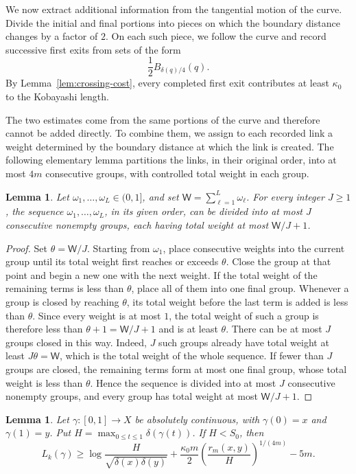 \documentclass[11pt]{article}
\newtheorem{lemma}[theorem]{Lemma}
\theoremstyle{definition}
\begin{document}
We now extract additional information from the tangential motion of the
curve.  Divide the initial and final portions into pieces on which the
boundary distance changes by a factor of \(2\).  On each such piece, we
follow the curve and record successive first exits from sets of the form
\[
\frac12 B_{\delta(q)/4}(q).
\]
By Lemma~\ref{lem:crossing-cost}, every completed first exit contributes
at least \(\kappa_0\) to the Kobayashi length.

The two estimates come from the same portions of the curve and therefore
cannot be added directly.  To combine them, we assign to each recorded
link a weight determined by the boundary distance at which the link is
created.  The following elementary lemma partitions the links, in their
original order, into at most \(4m\) consecutive groups, with controlled
total weight in each group.

\begin{lemma}\label{lem:weight-grouping}
	Let \(\omega_1,\ldots,\omega_L\in(0,1]\), and set
	\(\mathsf W=\sum_{\ell=1}^L\omega_\ell\).
	For every integer \(J\ge1\), the sequence
	\(\omega_1,\ldots,\omega_L\), in its given order, can be divided into
	at most \(J\) consecutive nonempty groups, each having total weight at
	most \(\mathsf W/J+1\).
\end{lemma}

\begin{proof}
	Set \(\theta=\mathsf W/J\).
	Starting from \(\omega_1\), place consecutive weights into the current
	group until its total weight first reaches or exceeds \(\theta\).  Close
	the group at that point and begin a new one with the next weight.  If
	the total weight of the remaining terms is less than \(\theta\), place
	all of them into one final group.
	Whenever a group is closed by reaching \(\theta\), its total weight
	before the last term is added is less than \(\theta\).  Since every
	weight is at most \(1\), the total weight of such a group is therefore
	less than \(\theta+1=\mathsf W/J+1\) and is at least \(\theta\).
	There can be at most \(J\) groups closed in this way.  Indeed, \(J\)
	such groups already have total weight at least
	\(J\theta=\mathsf W\),
	which is the total weight of the whole sequence.  If fewer than \(J\)
	groups are closed, the remaining terms form at most one final group,
	whose total weight is less than \(\theta\).  Hence the sequence is
	divided into at most \(J\) consecutive nonempty groups, and every group
	has total weight at most \(\mathsf W/J+1\).
\end{proof}
\begin{lemma}\label{lem:weighted-exits}
	Let \(\gamma:[0,1]\to X\) be absolutely continuous, with
	\(\gamma(0)=x\) and \(\gamma(1)=y\).  Put
	\(H=\max_{0\le t\le1}\delta(\gamma(t))\).
	If \(H<S_0\), then
	\begin{equation*}
		L_k(\gamma)
		\ge
		\log\frac{H}{\sqrt{\delta(x)\delta(y)}}
		+
		\frac{\kappa_0m}{2}
		\left(\frac{r_m(x,y)}{H}\right)^{1/(4m)}
		-5m.
	\end{equation*}
\end{lemma}
\end{document}
